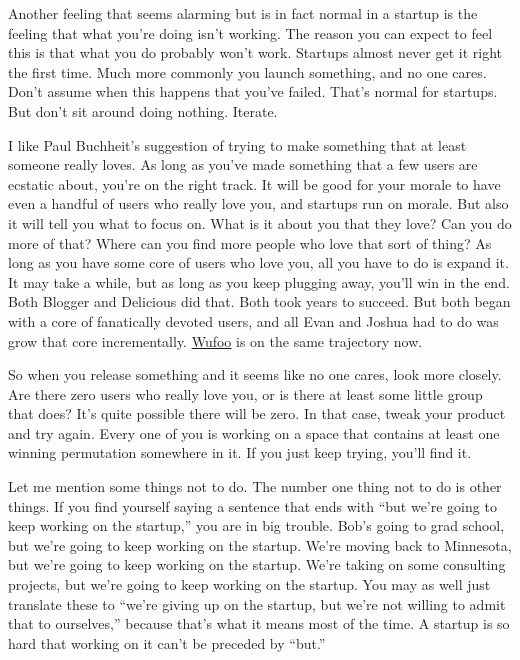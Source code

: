 Another feeling that seems alarming but is in fact normal in a startup
is the feeling that what you're doing isn't working. The reason you can
expect to feel this is that what you do probably won't work. Startups
almost never get it right the first time. Much more commonly you launch
something, and no one cares. Don't assume when this happens that you've
failed. That's normal for startups. But don't sit around doing nothing.
Iterate.

I like Paul Buchheit's suggestion of trying to make something that at
least someone really loves. As long as you've made something that a few
users are ecstatic about, you're on the right track. It will be good for
your morale to have even a handful of users who really love you, and
startups run on morale. But also it will tell you what to focus on. What
is it about you that they love? Can you do more of that? Where can you
find more people who love that sort of thing? As long as you have some
core of users who love you, all you have to do is expand it. It may take
a while, but as long as you keep plugging away, you'll win in the end.
Both Blogger and Delicious did that. Both took years to succeed. But
both began with a core of fanatically devoted users, and all Evan and
Joshua had to do was grow that core incrementally.
\href{http://wufoo.com}{Wufoo} is on the same trajectory now.

So when you release something and it seems like no one cares, look more
closely. Are there zero users who really love you, or is there at least
some little group that does? It's quite possible there will be zero. In
that case, tweak your product and try again. Every one of you is working
on a space that contains at least one winning permutation somewhere in
it. If you just keep trying, you'll find it.

Let me mention some things not to do. The number one thing not to do is
other things. If you find yourself saying a sentence that ends with
``but we're going to keep working on the startup,'' you are in big
trouble. Bob's going to grad school, but we're going to keep working on
the startup. We're moving back to Minnesota, but we're going to keep
working on the startup. We're taking on some consulting projects, but
we're going to keep working on the startup. You may as well just
translate these to ``we're giving up on the startup, but we're not
willing to admit that to ourselves,'' because that's what it means most
of the time. A startup is so hard that working on it can't be preceded
by ``but.''

